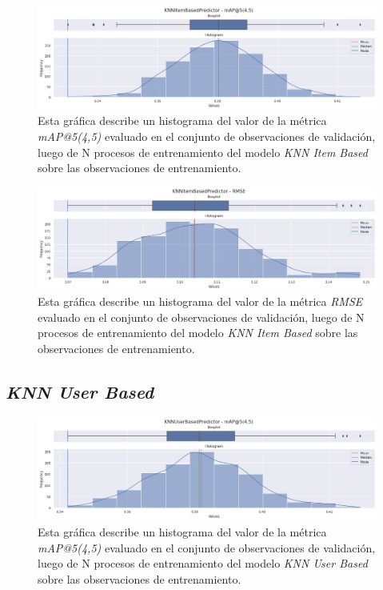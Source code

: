 \documentclass[11pt,a4paper,twoside]{thesis}
\begin{document}
{\begin{figure}[!htb]
	\centering
	\includegraphics[width=15cm]{./images/metrics-knn-item-based-mapk.png}
	\caption{Esta gráfica describe un histograma del valor de la métrica \textit{mAP@5(4,5)} evaluado en el conjunto de observaciones de validación, luego de N procesos de entrenamiento del modelo \textit{KNN Item Based} sobre las observaciones de entrenamiento.}
\end{figure}

\clearpage


\begin{figure}[!htb]
	\centering
	\includegraphics[width=15cm]{./images/metrics-knn-item-based-RMSE.png}
	\caption{Esta gráfica describe un histograma del valor de la métrica \textit{RMSE} evaluado en el conjunto de observaciones de validación, luego de N procesos de entrenamiento del modelo \textit{KNN Item Based} sobre las observaciones de entrenamiento.}
\end{figure}

\subsection{\textit{KNN User Based}}

\begin{figure}[!htb]
	\centering
	\includegraphics[width=15cm]{./images/metrics-knn-user-based-mapk.png}
	\caption{Esta gráfica describe un histograma del valor de la métrica \textit{mAP@5(4,5)} evaluado en el conjunto de observaciones de validación, luego de N procesos de entrenamiento del modelo \textit{KNN User Based} sobre las observaciones de entrenamiento.}
\end{figure}


}
\end{document}
